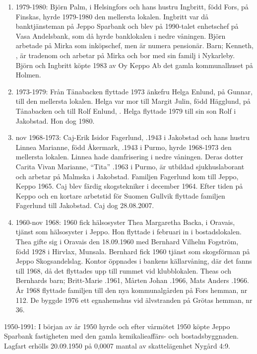 \begin{enumerate}
  \item 1979-1980: Björn Palm,  i Helsingfors och hans hustru Ingbritt, född Fors,  på Finskas, hyrde 1979-1980 den mellersta lokalen. Ingbritt var då banktjänsteman på Jeppo Sparbank och blev på 1990-talet enhetschef på Vasa Andelsbank, som då hyrde banklokalen i nedre våningen. Björn arbetade på Mirka som inköpschef, men är numera pensionär.
  Barn; Kenneth, , är tradenom och arbetar på Mirka och bor med sin familj i Nykarleby. Björn och Ingbritt köpte 1983 av Oy Keppo Ab det gamla kommunalhuset på Holmen.
  \item 1973-1979: Från Tånabacken flyttade 1973 änkefru Helga Enlund,  på Gunnar, till den mellersta lokalen. Helga var mor till Margit Julin, född Hägglund,  på Tånabacken och till Rolf Enlund, . Helga flyttade 1979 till sin son Rolf i Jakobstad. Hon dog 1980.
  \item nov 1968-1973: Caj-Erik Isidor Fagerlund, .1943 i Jakobstad och hans hustru Linnea Marianne, född Åkermark, .1943 i Purmo, hyrde 1968-1973  den mellersta lokalen. Linnea hade damfrisering i nedre våningen. Deras dotter Carita Vivan Marianne, ``Tita'' .1963 i Purmo, är utbildad sjukhuslaborant och arbetar på Malmska i Jakobstad. Familjen Fagerlund kom till Jeppo, Keppo 1965. Caj blev färdig skogstekniker i december 1964. Efter tiden på Keppo och	en kortare arbetstid för Suomen Gullvik flyttade familjen Fagerlund till Jakobstad. Caj dog 28.08.2007.
  \item 1960-nov 1968: 1960 fick hälsosyster Thea Margaretha Backa,  i Oravais, tjänst som hälsosyster i Jeppo. Hon flyttade i februari in i	bostadslokalen. Thea gifte sig i Oravais den 18.09.1960 med Bernhard	Vilhelm Fogström, född 1928 i Hirvlax, Munsala. Bernhard fick 1960 	tjänst som skogsförman på Jeppo Skogsandelslag. Kontor öppnades i 	bankens källarvåning, där det fanns till 1968, då det flyttades upp till rummet vid klubblokalen. Theas och Bernhards barn;	Britt-Marie	.1961, Mårten Johan .1966, Mats Anders	.1966.	År 1968 flyttade familjen till den nya kommunalgården på Fors hemman, nr 112. De byggde 1976 ett egnahemshus vid älvstranden på Grötas hemman, nr 36.
\end{enumerate}

1950-1991:
I början av år 1950 hyrde och efter vårmötet 1950 köpte Jeppo Sparbank fastigheten med den gamla kemikalieaffärs- och 	bostadsbyggnaden. Lagfart erhölls 20.09.1950 på 0,0007 mantal	av skattelägenhet Nygård 4:9.



